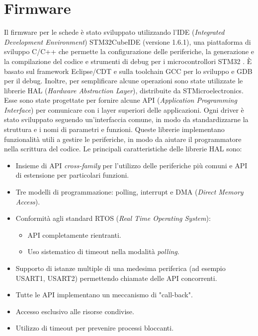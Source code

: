 \section{Firmware}
Il firmware per le schede è stato sviluppato utilizzando l'IDE (\textit{Integrated Development Environment}) STM32CubeIDE (versione 1.6.1), una piattaforma di sviluppo C/C++ che permette la configurazione delle periferiche, la generazione e la compilazione del codice e strumenti di debug per i microcontrollori STM32 \cite{STMicroelectronicsSTM32CubeIDE}. \`E basato sul framework Eclipse\textregistered/CDT e sulla toolchain GCC per lo sviluppo e GDB per il debug. Inoltre, per semplificare alcune operazioni sono state utilizzate le librerie HAL (\textit{Hardware Abstraction Layer}), distribuite da STMicroelectronics. Esse sono state progettate per fornire alcune API (\textit{Application Programming Interface}) per comunicare con i layer superiori delle applicazioni\cite{STMicroelectronicsHAL}. Ogni driver è stato sviluppato seguendo un'interfaccia comune, in modo da standardizzarne la struttura e i nomi di parametri e funzioni. Queste librerie implementano funzionalità utili a gestire le periferiche, in modo da aiutare il programmatore nella scrittura del codice.
Le principali caratteristiche delle librerie HAL sono:
\begin{itemize}
	\item Insieme di API \textit{cross-family} per l'utilizzo delle periferiche più comuni e API di estensione per particolari funzioni.
	\item Tre modelli di programmazione: polling, interrupt e DMA (\textit{Direct Memory Access}).
	\item Conformità agli standard RTOS (\textit{Real Time Operating System}):
	\begin{itemize}
		\item API completamente rientranti.
		\item Uso sistematico di timeout nella modalità \textit{polling}.
	\end{itemize}
	\item Supporto di istanze multiple di una medesima periferica (ad esempio USART1, USART2) permettendo chiamate delle API concorrenti.
	\item Tutte le API implementano un meccanismo di "call-back".
	\item Accesso esclusivo alle risorse condivise.
	\item Utilizzo di timeout per prevenire processi bloccanti.
\end{itemize}


\clearpage